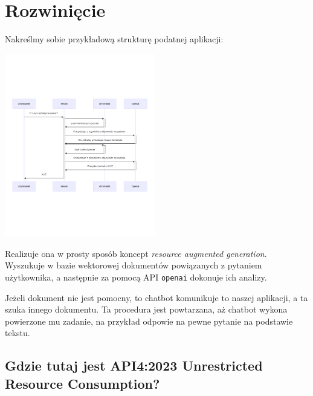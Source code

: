 \documentclass[12pt,aspectratio=169]{beamer}
\begin{document}
\section{Rozwinięcie}
\begin{frame}

Nakreślmy sobie przykładową strukturę podatnej aplikacji:

  \includegraphics[height=8cm]{media/structure.png}
  \centering

\end{frame}
\begin{frame}

Realizuje ona w prosty sposób koncept \emph{resource augmented generation}.
Wyszukuje w bazie wektorowej dokumentów powiązanych z pytaniem użytkownika, a
następnie za pomocą API \texttt{openai} dokonuje ich analizy. \pause

Jeżeli dokument nie jest pomocny, to chatbot komunikuje to naszej aplikacji, a 
ta szuka innego dokumentu. Ta procedura jest powtarzana, aż chatbot wykona
powierzone mu zadanie, na przykład odpowie na pewne pytanie na podstawie tekstu.

\end{frame}

\subsection*{Gdzie tutaj jest API4:2023 Unrestricted Resource
Consumption?}
\end{document}
